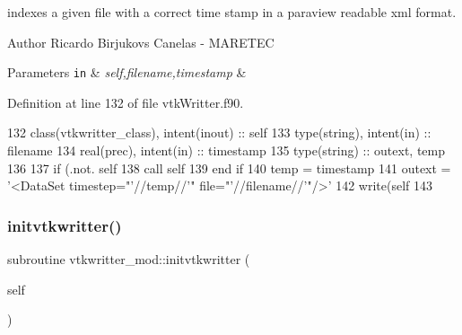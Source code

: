 indexes a given file with a correct time stamp in a paraview readable xml format. 

\begin{DoxyAuthor}{Author}
Ricardo Birjukovs Canelas -\/ M\+A\+R\+E\+T\+EC 
\end{DoxyAuthor}

\begin{DoxyParams}[1]{Parameters}
\mbox{\tt in}  & {\em self,filename,timestamp} & \\
\hline
\end{DoxyParams}


Definition at line 132 of file vtk\+Writter.\+f90.


\begin{DoxyCode}
132     \textcolor{keywordtype}{class}(vtkwritter\_class), \textcolor{keywordtype}{intent(inout)} :: self
133     \textcolor{keywordtype}{type}(string), \textcolor{keywordtype}{intent(in)} :: filename
134     \textcolor{keywordtype}{real(prec)}, \textcolor{keywordtype}{intent(in)} :: timestamp
135     \textcolor{keywordtype}{type}(string) :: outext, temp
136     
137     \textcolor{keywordflow}{if} (.not. self%
138         \textcolor{keyword}{call }self%
139 \textcolor{keywordflow}{    end if}
140     temp = timestamp
141     outext = \textcolor{stringliteral}{'<DataSet timestep="'}//temp//\textcolor{stringliteral}{'" file="'}//filename//\textcolor{stringliteral}{'"/>'}
142     \textcolor{keyword}{write}(self%
143     
\end{DoxyCode}
\mbox{\label{namespacevtkwritter__mod_abd35d591c8e15730a277b2d26deb83e8}} 
\subsubsection{\texorpdfstring{initvtkwritter()}{initvtkwritter()}}
{\footnotesize\ttfamily subroutine vtkwritter\+\_\+mod\+::initvtkwritter (\begin{DoxyParamCaption}\item[{class(\mbox{\hyperlink{structvtkwritter__mod_1_1vtkwritter__class}{vtkwritter\+\_\+class}}), intent(inout)}]{self }\end{DoxyParamCaption})\hspace{0.3cm}{\ttfamily [private]}}



